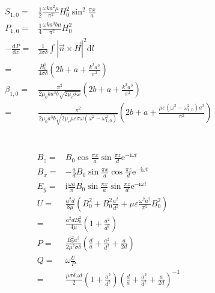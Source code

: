 \documentclass[10pt,fleqn]{article}
\newcommand{\ud}{\mathrm{d}}
\newcommand{\ue}{\mathrm{e}}
\newcommand{\ui}{\mathrm{i}}
\newcommand{\eqar}[1]
{
  \begin{align*}
    #1
  \end{align*}
}
\newcommand{\paren}[1]{{\left({#1}\right)}}
\newcommand{\abs}[1]{{\left|{#1}\right|}}
\newcommand{\diff}[3][{}]{{\frac{\ud^{#1} {#2}}{\ud {#3}{}^{#1}}}}
\begin{document}
\section{}
\eqar{
  S_{1,0}=&\frac12\frac{\omega ka^2\mu}{\pi^2}H_0^2\sin^2\frac{\pi x}{a}\\
  P_{1,0}=&\frac14\frac{\omega ka^3b\mu}{\pi^2}H_0^2\\
  -\diff{P}{z}=&\frac{1}{2\sigma\delta}\int\abs{\vec n\times\vec H}^2\ud l\\
  =&\frac{H_0^2}{4\sigma\delta}\paren{2b+a+\frac{k^2a^3}{\pi^2}}\\
  \beta_{1,0}=&\frac{\pi^2}{2\mu_0ka^3b\sqrt{2\mu_c\sigma\omega}}\paren{2b+a+\frac{k^2a^3}{\pi^2}}\\
  =&\frac{\pi^2}{2\mu_0a^3b\sqrt{2\mu_c\mu\varepsilon\sigma\omega\paren{\omega^2-\omega_{1,0}^2}}}\paren{2b+a+\frac{\mu\varepsilon\paren{\omega^2-\omega_{1,0}^2}a^3}{\pi^2}}
}

\section{}
\eqar{
  B_z=&B_0\cos\frac{\pi x}{a}\sin\frac{\pi z}{d}\ue^{-\ui\omega t}\\
  B_x=&-\frac{a}{d}B_0\sin\frac{\pi x}{a}\cos\frac{\pi z}{d}\ue^{-\ui\omega t}\\
  E_y=&\ui\frac{\omega a}{\pi}B_0\sin\frac{\pi x}{a}\sin\frac{\pi z}{d}\ue^{-\ui\omega t}\\
  U=&\frac{a^2d}{8\mu}\paren{B_0^2+B_0^2\frac{a^2}{d^2}+\mu\varepsilon\frac{\omega^2a^2}{\pi^2}B_0^2}\\
  =&\frac{a^2dB_0^2}{4\mu}\paren{1+\frac{a^2}{d^2}}\\
  P=&\frac{B_0^2a^2}{2\mu^2\sigma\delta}\paren{\frac{d}{a}
    +\frac{a^2}{d^2}+\frac{a}{2d}}\\
  Q=&\omega\frac{U}{P}\\
  =&\frac{\mu\sigma\delta\omega d}{2}
  \paren{1+\frac{a^2}{d^2}}\paren{\frac{d}{a}+\frac{a^2}{d^2}+\frac{a}{2d}}^{-1}
}

\section{}
\end{document}
